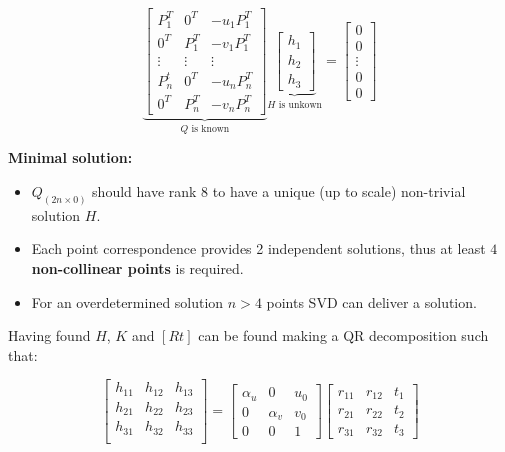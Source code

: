 \documentclass[10pt,a4paper]{scrartcl}
\begin{document}
\begin{multicols*}{2}
\begin{enumerate}
\begin{equation*}
\underbrace{\begin{bmatrix}
P_1^T&0^T&-u_1 P_1^T\\
0^T&P_1^T&-v_1P_1^T\\
\vdots&\vdots&\vdots\\
P_n^t&0^T&-u_nP_n^T\\
0^T&P_n^T&-v_nP_n^T
\end{bmatrix}}_{Q \text{ is known}}\underbrace{\begin{bmatrix}
h_1\\h_2\\h_3
\end{bmatrix}}_{H \text{ is unkown}}=\begin{bmatrix}
0\\0\\\vdots\\0\\0
\end{bmatrix}
\end{equation*}

\end{enumerate}

\textbf{Minimal solution:}

\begin{itemize}
\item $Q_{(2n\times 0)}$ should have rank $8$ to have a unique (up to scale) non-trivial solution $H$.
\item Each point correspondence provides 2 independent solutions, thus at least $4$ \textbf{non-collinear points} is required.
\item For an overdetermined solution $n>4$ points SVD can deliver a solution.
\end{itemize}

Having found $H$, $K$ and $[R t]$ can be found making a QR decomposition such that:

\begin{equation*}
\begin{bmatrix}
h_{11}&h_{12}&h_{13}\\
h_{21}&h_{22}&h_{23}\\
h_{31}&h_{32}&h_{33}\\
\end{bmatrix}=\begin{bmatrix}\alpha_u&0&u_0\\0&\alpha_v&v_0\\0&0&1\end{bmatrix}\begin{bmatrix}
r_{11}&r_{12}&t_1\\r_{21}&r_{22}&t_2\\r_{31}&r_{32}&t_3
\end{bmatrix}
\end{equation*}


\end{multicols*}
\end{document}
